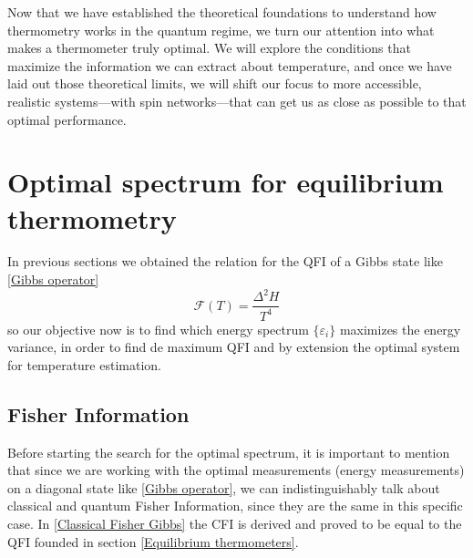 Now that we have established the theoretical foundations to understand how thermometry works in the quantum regime, we turn our attention into what makes a thermometer truly optimal. We will explore the conditions that maximize the information we can extract about temperature, and once we have laid out those theoretical limits, we will shift our focus to more accessible, realistic systems—with spin networks—that can get us as close as possible to that optimal performance.

\section{Optimal spectrum for equilibrium thermometry}\label{Optimal spectrum}
In previous sections we obtained the relation for the QFI of a Gibbs state like \eqref{Gibbs operator}
\begin{equation}
    \mathcal{F}(T)=\frac{\Delta^2 H}{T^4}
\end{equation}
so our objective now is to find which energy spectrum $\{\varepsilon_i\}$ maximizes the energy variance, in order to find de maximum QFI and by extension the optimal system for temperature estimation.

\subsection{Fisher Information}
Before starting the search for the optimal spectrum, it is important to mention that since we are working with the optimal measurements (energy measurements) on a diagonal state like \eqref{Gibbs operator}, we can indistinguishably talk about classical and quantum Fisher Information, since they are the same in this specific case. In \ref{Classical Fisher Gibbs} the CFI is derived and proved to be equal to the QFI founded in section \ref{Equilibrium thermometers}.

